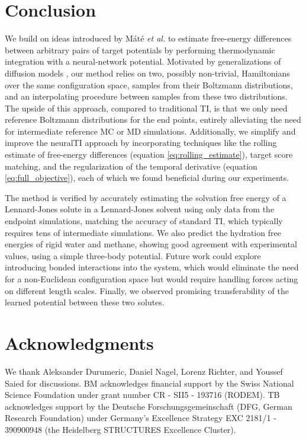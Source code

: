 \documentclass[%
onecolumn,
superscriptaddress,
nofootinbib,
amsmath,amssymb,
table
]{revtex4-2}
\begin{document}
\section{Conclusion}
We build on ideas introduced by M\'at\'e \emph{et al.} \cite{mate2024neural} to estimate free-energy differences between arbitrary pairs of target potentials by performing thermodynamic integration with a neural-network potential. Motivated by generalizations of diffusion models \cite{lipman2022flow,albergo2023buildingnormalizingflowsstochastic}, our method relies on two, possibly non-trivial, Hamiltonians over the same configuration space, samples from their Boltzmann distributions, and an interpolating procedure between samples from these two distributions. The upside of this approach, compared to traditional TI, is that we only need reference Boltzmann distributions for the end points, entirely alleviating the need for intermediate reference MC or MD simulations. Additionally, we simplify and improve the neuralTI approach by incorporating techniques like the rolling estimate of free-energy differences (equation \ref{eq:rolling_estimate}), target score matching, and the regularization of the temporal derivative (equation \ref{eq:full_objective}), each of which we found beneficial during our experiments.

The method is verified by accurately estimating the solvation free energy of a Lennard-Jones solute in a Lennard-Jones solvent using only data from the endpoint simulations, matching the accuracy of standard TI, which typically requires tens of intermediate simulations. We also predict the hydration free energies of rigid water and methane, showing good agreement with experimental values, using a simple three-body potential. Future work could explore introducing bonded interactions into the system, which would eliminate the need for a non-Euclidean configuration space but would require handling forces acting on different length scales. Finally, we observed promising transferability of the learned potential between these two solutes.



 
\section*{Acknowledgments}
We thank Aleksander Durumeric, Daniel Nagel, Lorenz Richter, and Youssef Saied for discussions. BM acknowledges financial support by the Swiss National Science Foundation under grant number CR - SII5 - 193716 (RODEM). TB acknowledges support by the Deutsche Forschungsgemeinschaft (DFG, German Research Foundation) under Germany's Excellence Strategy EXC 2181/1 - 390900948 (the Heidelberg STRUCTURES Excellence Cluster).




\end{document}
